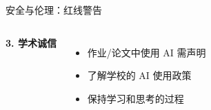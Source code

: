\begin{frame}{安全与伦理：红线警告}
\begin{columns}
		\vspace{0.2cm}

		\textbf{3. 学术诚信}

		\begin{itemize}
			\item 作业/论文中使用 AI 需声明
			\item 了解学校的 AI 使用政策
			\item 保持学习和思考的过程
		\end{itemize}
	\end{columns}
\end{frame}
